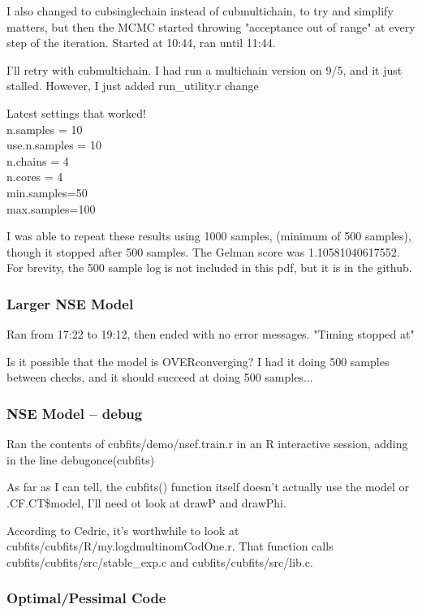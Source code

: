 \documentclass[11pt]{article} %
\begin{document}
I also changed to cubsinglechain instead of cubmultichain, to try and simplify matters, but then the MCMC started throwing "acceptance out of range" at every step of the iteration. Started at 10:44, ran until 11:44. 

I'll retry with cubmultichain. I had run a multichain version on 9/5, and it just stalled. However, I just added run\_utility.r change

Latest settings that worked!
\\n.samples = 10  
\\use.n.samples = 10
\\n.chains = 4
\\n.cores = 4
\\min.samples=50
\\max.samples=100




I was able to repeat these results using 1000 samples, (minimum of 500 samples), though it stopped after 500 samples. The Gelman score was 1.10581040617552. For brevity, the 500 sample log is not included in this pdf, but it is in the github.


\subsubsection{Larger NSE Model}

Ran from 17:22 to 19:12, then ended with no error messages. "Timing stopped at"

Is it possible that the model is OVERconverging? I had it doing 500 samples between checks, and it should succeed at doing 500 samples...


\subsubsection{NSE Model -- debug}

Ran the contents of cubfits/demo/nsef.train.r in an R interactive session, adding in the line debugonce(cubfits)

As far as I can tell, the cubfits() function itself doesn't actually use the model or .CF.CT\$model, I'll need ot look at drawP and drawPhi.

According to Cedric, it's worthwhile to look at cubfits/cubfits/R/my.logdmultinomCodOne.r. That function calls cubfits/cubfits/src/stable\_exp.c and cubfits/cubfits/src/lib.c.


\subsubsection{Optimal/Pessimal Code}
\end{document}
